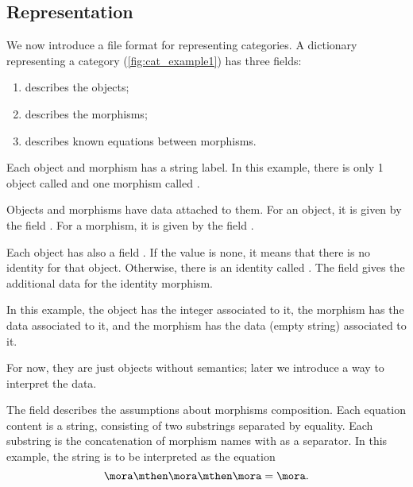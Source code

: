 \subsection{Representation}

\begin{marginfigure}
\end{marginfigure}

We now introduce a file format for representing categories.
A dictionary representing a category (\cref{fig:cat_example1}) has three fields:
\begin{enumerate}
    \item {} describes the objects;
    \item {} describes the morphisms;
    \item {} describes known equations between morphisms.
\end{enumerate}
Each object and morphism has a string label. In this example, there is only 1 object called 
and one morphism called .

Objects and morphisms have data attached to them. 
For an object, it is given by the field . For a morphism, it is given by the field .

Each object has also a field . If the value is none, it means that there is no identity for that object.
Otherwise, there is an identity called . The field  gives the additional data for the identity morphism.

In this example, the object  has the integer  associated to it, the morphism  has the data  associated to it, and the morphism  has the data  (empty string) associated to it.

For now, they are just objects without semantics; later we introduce a way to interpret the data.


The field  describes the assumptions about morphisms composition. Each equation content is a string, consisting of two substrings separated by equality. Each substring is the concatenation of morphism names with \str{;} as a separator. In this example, the string  is to be interpreted as the equation
\begin{equation}\label{eq:fffef}
    \mora \mthen \mora \mthen \mora = \mora.
\end{equation}

